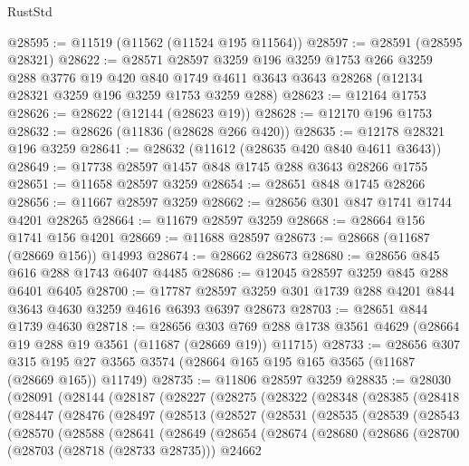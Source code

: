 \begin{lexlean}{RustStd}
\begin{coremodule}
@28595 := @11519 (@11562 (@11524 @195 @11564))
@28597 := @28591 (@28595 @28321)
@28622 := @28571
    @28597
    @3259
    @196
    @3259
    @1753
    @266
    @3259
    @288
    @3776
    @19
    @420
    @840
    @1749
    @4611
    @3643
    @3643
    @28268
    (@12134 @28321 @3259 @196 @3259 @1753 @3259 @288)
@28623 := @12164 @1753
@28626 := @28622 (@12144 (@28623 @19))
@28628 := @12170 @196 @1753
@28632 := @28626 (@11836 (@28628 @266 @420))
@28635 := @12178 @28321 @196 @3259
@28641 := @28632 (@11612 (@28635 @420 @840 @4611 @3643))
@28649 := @17738 @28597 @1457 @848 @1745 @288 @3643 @28266 @1755
@28651 := @11658 @28597 @3259
@28654 := @28651 @848 @1745 @28266
@28656 := @11667 @28597 @3259
@28662 := @28656 @301 @847 @1741 @1744 @4201 @28265
@28664 := @11679 @28597 @3259
@28668 := @28664 @156 @1741 @156 @4201
@28669 := @11688 @28597
@28673 := @28668 (@11687 (@28669 @156)) @14993
@28674 := @28662 @28673
@28680 := @28656 @845 @616 @288 @1743 @6407 @4485
@28686 := @12045 @28597 @3259 @845 @288 @6401 @6405
@28700 := @17787 @28597 @3259 @301 @1739 @288 @4201 @844 @3643 @4630 @3259 @4616 @6393 @6397 @28673
@28703 := @28651 @844 @1739 @4630
@28718 := @28656
    @303
    @769
    @288
    @1738
    @3561
    @4629
    (@28664 @19 @288 @19 @3561 (@11687 (@28669 @19)) @11715)
@28733 := @28656
    @307
    @315
    @195
    @27
    @3565
    @3574
    (@28664 @165 @195 @165 @3565 (@11687 (@28669 @165)) @11749)
@28735 := @11806 @28597 @3259
@28835 := @28030
    (@28091
      (@28144
        (@28187
          (@28227
            (@28275
              (@28322
                (@28348
                  (@28385
                    (@28418
                      (@28447
                        (@28476
                          (@28497
                            (@28513
                              (@28527
                                (@28531
                                  (@28535
                                    (@28539
                                      (@28543
                                        (@28570
                                          (@28588
                                            (@28641
                                              (@28649
                                                (@28654
                                                  (@28674
                                                    (@28680
                                                      (@28686
                                                        (@28700
                                                          (@28703 (@28718 (@28733 @28735)))
                                                          @24662

\end{coremodule}
\end{lexlean}
